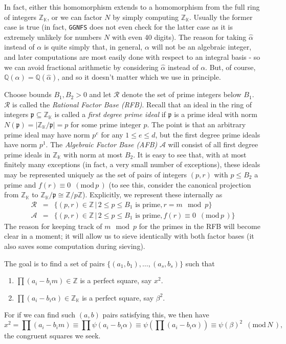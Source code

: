 \documentclass[12pt]{article}
\newcommand{\K}{\mathbb{K}}
\newcommand{\Z}{\mathbb{Z}}
\newcommand{\Q}{\mathbb{Q}}
\newcommand{\rfb}{\mathcal{R}}
\newcommand{\afb}{\mathcal{A}}
\newcommand{\p}{\mathfrak{p}}
\newcommand{\md}[1]{\,\,\, ( \mathrm{mod}\, #1 \,) }
\begin{document}
  In fact, either this homomorphism extends to a homomorphism
  from the full ring of integers $\Z_\K$, or we can factor
  $N$ by simply computing $\Z_\K$. Usually the former case is
  true (in fact, {\tt GGNFS} does not even check for the latter
  case as it is extremely unlikely for numbers $N$ with even 40
  digits). The reason for taking $\hat{\alpha}$ instead of $\alpha$
  is quite simply that, in general, $\alpha$ will not be an algebraic
  integer, and later computations are most easily done with respect
  to an integral basis - so we can avoid fractional arithmetic
  by considering $\hat{\alpha}$ instead of $\alpha$.
  But, of course, $\Q(\alpha)=\Q(\hat{\alpha})$, and so it doesn't
  matter which we use in principle.



  Choose bounds $B_1, B_2 > 0$ and let $\rfb$ denote the set
  of prime integers below $B_1$. $\rfb$ is called the 
  {\em Rational Factor Base (RFB)}. Recall that an ideal
  in the ring of integers $\p\subseteq \Z_\K$ is called
  a {\em first degree prime ideal} if $\p$ is a prime
  ideal with norm $N(\p) = \vert \Z_\K/\p \vert = p$ for some
  prime integer $p$. The point is that an arbitrary prime
  ideal may have norm $p^e$ for any $1\le e\le d$, but the
  first degree prime ideals have norm $p^1$. The 
  {\em Algebraic Factor Base (AFB)} $\afb$ will consist of
  all first degree prime ideals in $\Z_\K$ with norm at most
  $B_2$. It is easy to see that, with at most finitely many exceptions
  (in fact, a very small number of exceptions), these ideals
  may be represented uniquely as the set of pairs of integers
  $(p,r)$ with $p\le B_2$ a prime and $f(r)\equiv 0\md{p}$
  (to see this, consider the canonical projection from
  $\Z_\K$ to $\Z_\K/\p \cong \Z/p\Z$).
  Explicitly, we represent these internally as
  \begin{eqnarray}
    \rfb &=& \{ (p,r)\in\Z \,\vert\, 2\le p \le B_1 \mbox{ is prime}, r=m\mod p \}\\
    \afb &=& \{ (p,r)\in \Z \,\vert\, 2\le p \le B_1 \mbox{ is prime}, f(r)\equiv 0\md{p} \}
  \end{eqnarray}
  The reason for keeping track of $m\mod p$ for the primes in the RFB will
  become clear in a moment; it will allow us to sieve identically with both 
  factor bases (it also saves some computation during sieving).

  The goal is to find a set of pairs $\{(a_1, b_1),\ldots ,(a_s, b_s)\}$
  such that
  \begin{enumerate}
    \item
      $\prod(a_i - b_im)\in\Z$ is a perfect square, say $x^2$.
    \item
      $\prod(a_i - b_i\alpha)\in\Z_\K$ is a perfect square, say $\beta^2$.
  \end{enumerate}
  For if we can find such $(a,b)$ pairs satisfying this, we then have
  \[
    x^2 = \prod(a_i - b_im) \equiv \prod \psi(a_i-b_i\alpha)
                            \equiv \psi(\prod(a_i - b_i\alpha))
                            \equiv \psi(\beta)^2 \md{N},
  \]
  the congruent squares we seek.
\end{document}
